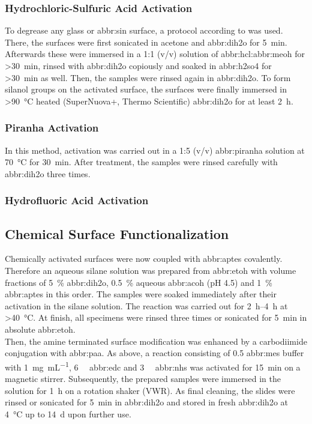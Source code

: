 \subsubsection{Hydrochloric-Sulfuric Acid Activation}
To degrease any glass or \gls{abbr:sin} surface, a protocol according to \citet{lit:chem:Dressick} was used. There, the surfaces were first sonicated in acetone and \gls{abbr:dih2o}  for \SI{5}{\minute}. Afterwards these were immersed in a 1:1 (v/v) solution of \gls{abbr:hcl}:\gls{abbr:meoh} for \SI{>30}{\minute}, rinsed with \gls{abbr:dih2o} copiously and soaked in \gls{abbr:h2so4} for \SI{>30}{\minute} as well. Then, the samples were rinsed again in \acrlong{abbr:dih2o}. To form silanol groups on the activated surface, the surfaces were finally immersed in \SI{>90}{\degreeCelsius} heated (SuperNuova+, Thermo Scientific) \gls{abbr:dih2o}  for at least \SI{2}{\hour}.
\subsubsection{Piranha Activation}
In this method, activation was carried out in a 1:5 (v/v) \acrfull{abbr:piranha} solution at \SI{70}{\degreeCelsius} for \SI{30}{\minute}. After treatment, the samples were rinsed carefully with \gls{abbr:dih2o} three times.
\subsubsection{Hydrofluoric Acid Activation}

\subsection{Chemical Surface Functionalization}
Chemically activated surfaces were now coupled with \gls{abbr:aptes} covalently. Therefore an aqueous silane solution was prepared from \gls{abbr:etoh} with volume fractions of \SI{5}{\percent} \gls{abbr:dih2o}, \SI{0.5}{\percent} aqueous \gls{abbr:acoh} (pH 4.5) and \SI{1}{\percent} \gls{abbr:aptes} in this order. The samples were soaked immediately after their activation in the silane solution. The reaction was carried out for \SIrange{2}{4}{\hour} at \SI{>40}{\degreeCelsius}. At finish, all specimens were rinsed three times or sonicated for \SI{5}{\minute} in absolute \gls{abbr:etoh}.\\
Then, the amine terminated surface modification was enhanced by a carbodiimide conjugation with \gls{abbr:paa}. As above, a reaction consisting of \SI{0.5}{\molar} \gls{abbr:mes} buffer with \SI{1}{\milli\gram\per\milli\liter}, \SI{6}{\milli\molar} \gls{abbr:edc} and  \SI{3}{\milli\molar} \gls{abbr:nhs} was activated for \SI{15}{\minute} on a magnetic stirrer. Subsequently, the prepared samples were immersed in the solution for \SI{1}{\hour} on a rotation shaker (VWR). As final cleaning, the slides were rinsed or sonicated for \SI{5}{\minute} in \gls{abbr:dih2o} and stored in fresh \gls{abbr:dih2o} at \SI{4}{\degreeCelsius} up to \SI{14}{\day} upon further use.\cite{lib:chem:Anti-EpCAM-PAA}
